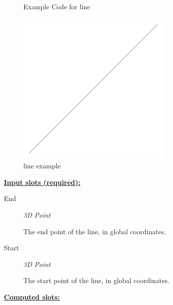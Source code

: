 \documentclass [11pt]{book}
\begin{document}
\begin{itemize}
\begin{figure}
\caption{Example Code for line}

\label{fig:example-code-line}

\end{figure}

\begin{figure}
\begin{center}
\includegraphics[width=3in,height=3in]{../images/example-line.pdf}
\end{center}

\caption{line example}

\label{fig:line}

\end{figure}





\textbf{
\underline{Input slots (required):}}

\begin{description}

\item [End]
\emph{3D Point}

 The end point of the line, in global coordinates.




\item [Start]
\emph{3D Point}

 The start point of the line, in global coordinates.




\end{description}






\textbf{
\underline{Computed slots:}}

\begin{description}


\end{description}
\end{itemize}
\end{document}
